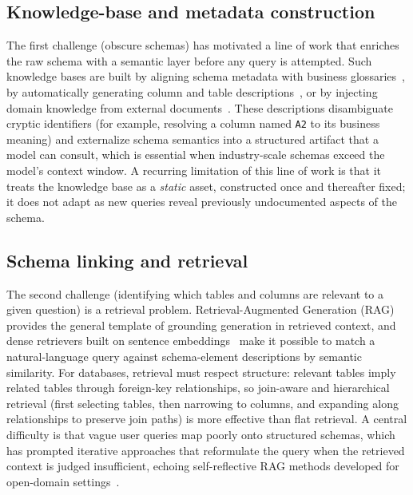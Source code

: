 \subsection{Knowledge-base and metadata construction}
The first challenge (obscure schemas) has motivated a line of work that enriches the raw schema with a semantic layer before any query is attempted. Such knowledge bases are built by aligning schema metadata with business glossaries~\cite{lobo2023matching}, by automatically generating column and table descriptions~\cite{gao2025automatic}, or by injecting domain knowledge from external documents~\cite{ma2024enhancing}. These descriptions disambiguate cryptic identifiers (for example, resolving a column named \texttt{A2} to its business meaning) and externalize schema semantics into a structured artifact that a model can consult, which is essential when industry-scale schemas exceed the model's context window. A recurring limitation of this line of work is that it treats the knowledge base as a \emph{static} asset, constructed once and thereafter fixed; it does not adapt as new queries reveal previously undocumented aspects of the schema.

\subsection{Schema linking and retrieval}
The second challenge (identifying which tables and columns are relevant to a given question) is a retrieval problem. Retrieval-Augmented Generation (RAG)~\cite{lewis2020retrieval} provides the general template of grounding generation in retrieved context, and dense retrievers built on sentence embeddings~\cite{reimers2019sentence} make it possible to match a natural-language query against schema-element descriptions by semantic similarity. For databases, retrieval must respect structure: relevant tables imply related tables through foreign-key relationships, so join-aware and hierarchical retrieval (first selecting tables, then narrowing to columns, and expanding along relationships to preserve join paths) is more effective than flat retrieval. A central difficulty is that vague user queries map poorly onto structured schemas, which has prompted iterative approaches that reformulate the query when the retrieved context is judged insufficient, echoing self-reflective RAG methods developed for open-domain settings~\cite{asai2023self}.

